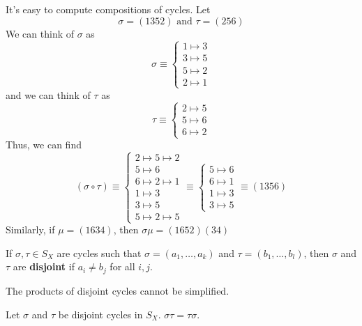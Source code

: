 \documentclass[12pt, letterpaper]{report}
\begin{document}
\begin{eg}
	It's easy to compute compositions of cycles. Let 
	\[
		\sigma =(1352)\text{ and } \tau =(256)
	\]
	We can think of \(\sigma \) as 
	\[
		\sigma \equiv \left\{\begin{array}{c}
			1\mapsto 3\\
			3\mapsto 5\\
			5\mapsto 2\\
			2\mapsto 1
		\end{array}\right.
	\]
	and we can think of \(\tau \) as 
	\[
		\tau \equiv \left\{\begin{array}{c}
			2\mapsto 5\\
			5\mapsto 6\\
			6\mapsto 2
		\end{array}\right.
	\]
	Thus, we can find
	\[
		(\sigma \circ \tau )\equiv \left\{\begin{array}{c}
			2\mapsto 5\mapsto 2\\
			5\mapsto 6\\
			6\mapsto 2\mapsto 1\\
			1\mapsto 3\\
			3\mapsto 5\\
			5\mapsto 2\mapsto 5
		\end{array}\right.\equiv \left\{\begin{array}{c}
			5\mapsto 6\\
			6\mapsto 1\\
			1\mapsto 3\\
			3\mapsto 5
		\end{array}\right.\equiv (1356)
	\]
	Similarly, if \(\mu =(1634)\), then \(\sigma \mu =(1652)(34)\) 
\end{eg}
\begin{definition}
	If \(\sigma ,\tau \in S_X\) are cycles such that \(\sigma =(a_1,\ldots,a_k)\) and \(\tau =(b_1,\ldots,b_l)\), then \(\sigma \) and \(\tau \) are \textbf{disjoint} if \(a_i \neq b_j\) for all \(i,j\).
\end{definition}
The products of disjoint cycles cannot be simplified.
\begin{proposition}
	Let \(\sigma \) and \(\tau \) be disjoint cycles in \(S_X\). \(\sigma \tau =\tau \sigma \).
\end{proposition}
\end{document}
